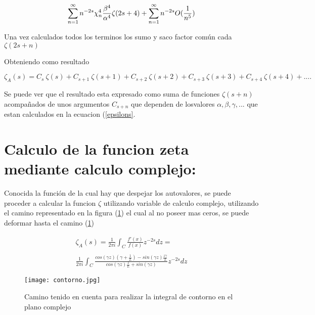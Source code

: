\begin{equation}
\sum _{n=1}  ^{\infty} n ^{-2s} \chi _n ^4 \\
\frac{\beta ^4}{\alpha ^4} \zeta (2s+4) + 
\sum _{n=1} ^{\infty} n ^{-2s} O( \frac{1}{n ^5} )
\end{equation}



Una vez calculados todos los terminos los sumo y saco factor común cada $\zeta( 2s+n )$


Obteniendo como resultado 

\begin{equation}
    \zeta _A (s) = 
    C _s \ \zeta (s) +
    C _{s+1} \ \zeta (s+1) + 
    C _{s+2} \ \zeta (s+2) +
    C _{s+3} \ \zeta (s+3) + 
    C _{s+4} \ \zeta (s+4) + ....
\end{equation}

Se puede ver que el resultado esta expresado como suma de funciones $\zeta (s+n)$ acompañados de unos argumentos $C_{s+n}$ que dependen de losvalores $\alpha,\beta,\gamma, ...$ que estan calculados en la ecuacion (\ref{epsilons}.

\section{Calculo de la funcion zeta mediante calculo complejo:}

Conocida la función de la cual hay que despejar los autovalores, se puede proceder a calcular la funcion $\zeta$ utilizando variable de calculo complejo, utilizando el camino representado en la figura (\ref{fig:contorno}) el cual al no poseer mas ceros, se puede deformar hasta el camino (\ref{fig:contorno}) 

\begin{equation}
\begin{array}{c}
   \zeta _A (s) =  \frac{1}{2 \pi i} \int _{C} \frac{f'(x)}{f(x)} z ^{-2s} dz = \\ 
   \\ 
    \frac{1}{2 \pi i} \int _{C}
    \frac{ cos(\gamma z) \left(\gamma + \frac{1}{L} \right) - sin(\gamma z) \frac{z \gamma}{L}
    }
    {cos(\gamma z) \frac{z}{L} + sin(\gamma z)
    }
    z ^{-2 s} dz
\end{array}
\end{equation}




\begin{figure}
\centering
\texttt{[image: contorno.jpg]}
\caption{Camino tenido en cuenta para realizar la integral de contorno en el plano complejo}
\label{fig:contorno}
\end{figure}


